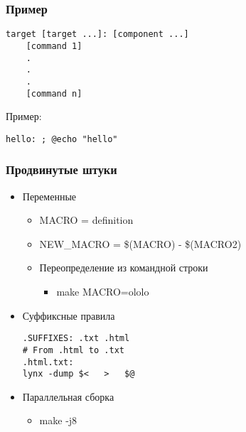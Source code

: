 \documentclass[xetex,mathserif,serif]{beamer}
\begin{document}
	\begin{frame}[fragile]
		\frametitle{Пример}
		\begin{footnotesize}
			\begin{verbatim}
target [target ...]: [component ...]
    [command 1]
    .
    .
    .
    [command n]
			\end{verbatim}
		\end{footnotesize}
		Пример:
		\begin{footnotesize}
			\begin{verbatim}
hello: ; @echo "hello"
			\end{verbatim}
		\end{footnotesize}
	\end{frame}

	\begin{frame}[fragile]
		\frametitle{Продвинутые штуки}
		\begin{itemize}
			\item Переменные
			\begin{itemize}
				\item MACRO = definition
				\item NEW\_MACRO = \$(MACRO) - \$(MACRO2)
				\item Переопределение из командной строки
				\begin{itemize}
					\item make MACRO=ololo
				\end{itemize}
			\end{itemize}
			\item Суффиксные правила
			\begin{footnotesize}
				\begin{verbatim}
.SUFFIXES: .txt .html
# From .html to .txt
.html.txt:
lynx -dump $<   >   $@
				\end{verbatim}
			\end{footnotesize}
			\item Параллельная сборка
			\begin{itemize}
				\item make -j8
			\end{itemize}
		\end{itemize}
	\end{frame}
\end{document}
